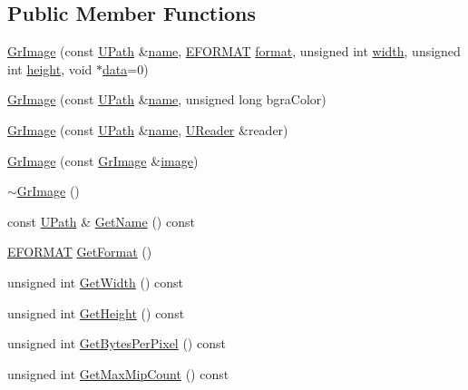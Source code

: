 \begin{CompactItemize}
\subsection*{Public Member Functions}
\begin{CompactItemize}
\item 
\hyperlink{class_gr_image_cfe18463a50aaaadf5a059537f3aebe3}{GrImage} (const \hyperlink{class_u_path}{UPath} \&\hyperlink{glext__bak_8h_bb62efe59ccdd153ce42e1a418352209}{name}, \hyperlink{class_gr_image_55bbf2a220e037e07616bb9c3f049786}{EFORMAT} \hyperlink{glext__bak_8h_e2d3db041c6004a67047659b42f73a44}{format}, unsigned int \hyperlink{wglext_8h_e6531b1788ca42a9ae8155b0c52e7630}{width}, unsigned int \hyperlink{wglext_8h_b2e63df950c3789599e1e43f477bc9e3}{height}, void $\ast$\hyperlink{glext__bak_8h_69926c009f2d52c6b6d2c76784af8c64}{data}=0)
\item 
\hyperlink{class_gr_image_b0282a1c9f181f55eecc2b8ec3fd8f5f}{GrImage} (const \hyperlink{class_u_path}{UPath} \&\hyperlink{glext__bak_8h_bb62efe59ccdd153ce42e1a418352209}{name}, unsigned long bgraColor)
\item 
\hyperlink{class_gr_image_da3f5e31181211ee5d86659bc02c88b0}{GrImage} (const \hyperlink{class_u_path}{UPath} \&\hyperlink{glext__bak_8h_bb62efe59ccdd153ce42e1a418352209}{name}, \hyperlink{class_u_reader}{UReader} \&reader)
\item 
\hyperlink{class_gr_image_f18a44493540afaae3df7a93700afa32}{GrImage} (const \hyperlink{class_gr_image}{GrImage} \&\hyperlink{glext__bak_8h_8943555672bc4b8056204eb92329cafa}{image})
\item 
\hyperlink{class_gr_image_e0891bd66f3e68c47d28ebd685908743}{$\sim$GrImage} ()
\item 
const \hyperlink{class_u_path}{UPath} \& \hyperlink{class_gr_image_05466580ff5934ea282b1ae32ee69cee}{GetName} () const 
\item 
\hyperlink{class_gr_image_55bbf2a220e037e07616bb9c3f049786}{EFORMAT} \hyperlink{class_gr_image_747e1e9fbe3f7faad890d217fe163d0d}{GetFormat} ()
\item 
unsigned int \hyperlink{class_gr_image_800124c1824ea3b75d989e0cab142ca7}{GetWidth} () const 
\item 
unsigned int \hyperlink{class_gr_image_5317f4f29d4145a774921960c54935af}{GetHeight} () const 
\item 
unsigned int \hyperlink{class_gr_image_b1d89088b96f628d59c886e1224f5ac2}{GetBytesPerPixel} () const 
\item 
unsigned int \hyperlink{class_gr_image_4dbab6db5578622e02b89ba5f5ebe5e3}{GetMaxMipCount} () const 

\end{CompactItemize}
\end{CompactItemize}
